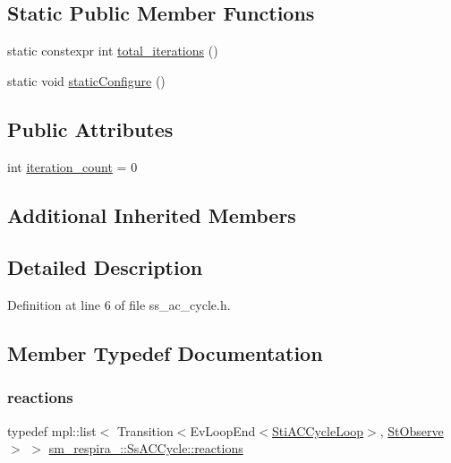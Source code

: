 \subsection*{Static Public Member Functions}
\begin{DoxyCompactItemize}
\item 
static constexpr int \hyperlink{structsm__respira__1_1_1SsACCycle_ada67628c77066b0c433f8e3562103efa}{total\+\_\+iterations} ()
\item 
static void \hyperlink{structsm__respira__1_1_1SsACCycle_a5c4b247393da864d1492cd53956cc343}{static\+Configure} ()
\end{DoxyCompactItemize}
\subsection*{Public Attributes}
\begin{DoxyCompactItemize}
\item 
int \hyperlink{structsm__respira__1_1_1SsACCycle_a4ef244bca6bba33cb2ad030666c4b47f}{iteration\+\_\+count} = 0
\end{DoxyCompactItemize}
\subsection*{Additional Inherited Members}


\subsection{Detailed Description}


Definition at line 6 of file ss\+\_\+ac\+\_\+cycle.\+h.



\subsection{Member Typedef Documentation}
\mbox{\label{structsm__respira__1_1_1SsACCycle_a4cdcfe6c1f129ede9cfb53e76b376e4f}} 
\subsubsection{\texorpdfstring{reactions}{reactions}}
{\footnotesize\ttfamily typedef mpl\+::list$<$ Transition$<$Ev\+Loop\+End$<$\hyperlink{structsm__respira__1_1_1ac__cycle__inner__states_1_1StiACCycleLoop}{Sti\+A\+C\+Cycle\+Loop}$>$, \hyperlink{structsm__respira__1_1_1StObserve}{St\+Observe}$>$ $>$ \hyperlink{structsm__respira__1_1_1SsACCycle_a4cdcfe6c1f129ede9cfb53e76b376e4f}{sm\+\_\+respira\+\_\+::\+Ss\+A\+C\+Cycle\+::reactions}}



